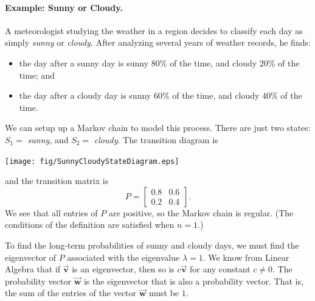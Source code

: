 \documentclass[reqno]{immbook}
\newcommand{\BV}{\vec{\textbf{v}}}
\newcommand{\BW}{\vec{\textbf{w}}}
\begin{document}
\paragraph{Example: Sunny or Cloudy.}
A meteorologist studying the weather in a region
decides to classify each day as simply \emph{sunny}
or \emph{cloudy}.  After analyzing several years of weather records,
he finds:
\begin{itemize}
\item the day after a sunny day is
sunny $80$\% of the time, and cloudy $20$\% of the time; and
\item the day after a cloudy day is
sunny $60$\% of the time, and cloudy $40$\% of the time.
\end{itemize}
We can setup up a Markov chain to model this process.
There are just two states: $S_1=$ \emph{sunny}, and $S_2 = $ \emph{cloudy}.
The transition diagram is

\medskip
\centerline{%
\texttt{[image: fig/SunnyCloudyStateDiagram.eps]}
}

\medskip
\noindent
and the transition matrix is
\begin{equation}
  P = \begin{bmatrix}
          0.8 & 0.6 \\
	  0.2 & 0.4 
      \end{bmatrix}.
\end{equation}
We see that all entries of $P$ are positive, so the Markov
chain is regular.  (The conditions of the 
definition are satisfied when $n=1$.)

To find the long-term probabilities of sunny and cloudy days,
we must find the eigenvector of $P$ associated with the
eigenvalue $\lambda=1$. We know from Linear Algebra that
if $\BV$ is an eigenvector, then so is $c\BV$ for any
constant $c\ne0$.  The probability vector $\BW$ is the
eigenvector that is also a probability vector. That is,
the sum of the entries of the vector $\BW$ must be $1$.
\end{document}
